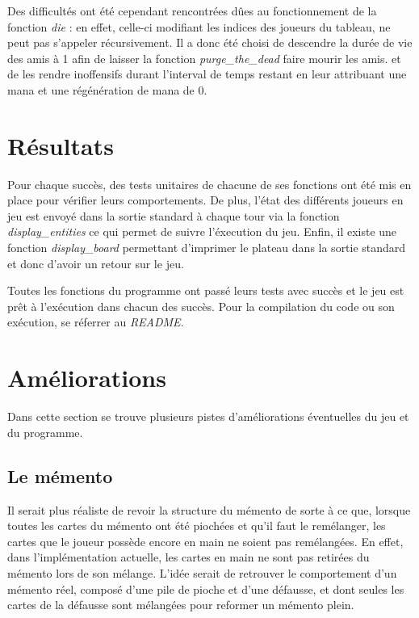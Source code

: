 \documentclass[12pt]{article}
\begin{document}
Des difficultés ont été cependant rencontrées dûes au fonctionnement de la fonction \textit{die} : en effet, celle-ci modifiant les indices des joueurs du tableau, ne peut pas s'appeler récursivement. Il a donc été choisi de descendre la durée de vie des amis à 1 afin de laisser la fonction \textit{purge\_the\_dead} faire mourir les amis. et de les rendre inoffensifs durant l'interval de temps restant en leur attribuant une mana et une régénération de mana de 0.

\section{Résultats}

Pour chaque succès, des tests unitaires de chacune de ses fonctions ont été mis en place pour vérifier leurs comportements.
De plus, l'état des différents joueurs en jeu est envoyé dans la sortie standard à chaque tour via la fonction \textit{display\_entities} ce qui permet de suivre l'éxecution du jeu.
Enfin, il existe une fonction \textit{display\_board} permettant d'imprimer le plateau dans la sortie standard et donc d'avoir un retour sur le jeu.

Toutes les fonctions du programme ont passé leurs tests avec succès et le jeu est prêt à l’exécution dans chacun des succès.
Pour la compilation du code ou son exécution, se réferrer au \textit{README}.

\section{Améliorations}

Dans cette section se trouve plusieurs pistes d'améliorations éventuelles du jeu et du programme.

\subsection{Le mémento}

Il serait plus réaliste de revoir la structure du mémento de sorte à ce que, lorsque toutes les cartes du mémento ont été piochées et qu'il faut le remélanger, les cartes que le joueur possède encore en main ne soient pas remélangées. En effet, dans l'implémentation actuelle, les cartes en main ne sont pas retirées du mémento lors de son mélange. L'idée serait de retrouver le comportement d'un mémento réel, composé d'une pile de pioche et d'une défausse, et dont seules les cartes de la défausse sont mélangées pour reformer un mémento plein.
\end{document}
